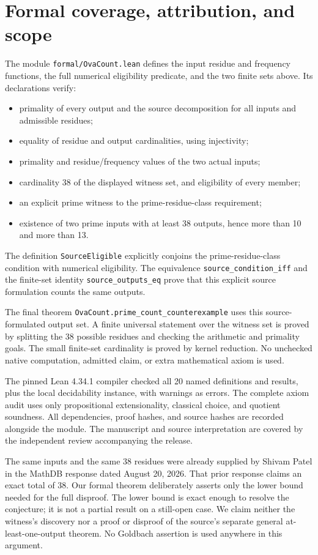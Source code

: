 \documentclass[11pt]{article}
\begin{document}
\section{Formal coverage, attribution, and scope}
The module \texttt{formal/OvaCount.lean} defines the input residue and frequency functions, the full numerical eligibility predicate, and the two finite sets above. Its declarations verify:
\begin{itemize}
\item primality of every output and the source decomposition for all inputs and admissible residues;
\item equality of residue and output cardinalities, using injectivity;
\item primality and residue/frequency values of the two actual inputs;
\item cardinality 38 of the displayed witness set, and eligibility of every member;
\item an explicit prime witness to the prime-residue-class requirement;
\item existence of two prime inputs with at least 38 outputs, hence more than 10 and more than 13.
\end{itemize}
The definition \texttt{SourceEligible} explicitly conjoins the prime-residue-class condition with numerical eligibility. The equivalence \texttt{source\_condition\_iff} and the finite-set identity \texttt{source\_outputs\_eq} prove that this explicit source formulation counts the same outputs.

The final theorem \texttt{OvaCount.prime\_count\_counterexample} uses this source-formulated output set. A finite universal statement over the witness set is proved by splitting the 38 possible residues and checking the arithmetic and primality goals. The small finite-set cardinality is proved by kernel reduction. No unchecked native computation, admitted claim, or extra mathematical axiom is used.

The pinned Lean 4.34.1 compiler checked all 20 named definitions and results, plus the local decidability instance, with warnings as errors. The complete axiom audit uses only propositional extensionality, classical choice, and quotient soundness. All dependencies, proof hashes, and source hashes are recorded alongside the module. The manuscript and source interpretation are covered by the independent review accompanying the release.

The same inputs and the same 38 residues were already supplied by Shivam Patel in the MathDB response dated August 20, 2026. That prior response claims an exact total of 38. Our formal theorem deliberately asserts only the lower bound needed for the full disproof. The lower bound is exact enough to resolve the conjecture; it is not a partial result on a still-open case. We claim neither the witness's discovery nor a proof or disproof of the source's separate general at-least-one-output theorem. No Goldbach assertion is used anywhere in this argument.
\end{document}
